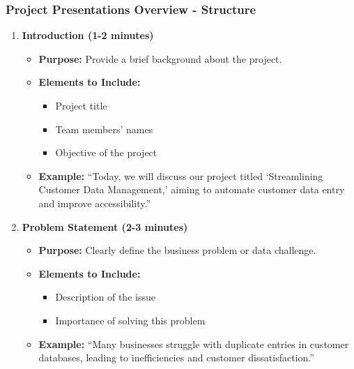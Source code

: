\documentclass{beamer}
\begin{document}
\begin{frame}[fragile]
    \frametitle{Project Presentations Overview - Structure}
    \begin{enumerate}
        \item \textbf{Introduction (1-2 minutes)}
        \begin{itemize}
            \item \textbf{Purpose:} Provide a brief background about the project.
            \item \textbf{Elements to Include:} 
            \begin{itemize}
                \item Project title
                \item Team members' names
                \item Objective of the project
            \end{itemize}
            \item \textbf{Example:} ``Today, we will discuss our project titled ‘Streamlining Customer Data Management,’ aiming to automate customer data entry and improve accessibility.”
        \end{itemize}

        \item \textbf{Problem Statement (2-3 minutes)}
        \begin{itemize}
            \item \textbf{Purpose:} Clearly define the business problem or data challenge.
            \item \textbf{Elements to Include:}
            \begin{itemize}
                \item Description of the issue
                \item Importance of solving this problem
            \end{itemize}
            \item \textbf{Example:} ``Many businesses struggle with duplicate entries in customer databases, leading to inefficiencies and customer dissatisfaction.”
        \end{itemize}
    \end{enumerate}
\end{frame}
\end{document}

